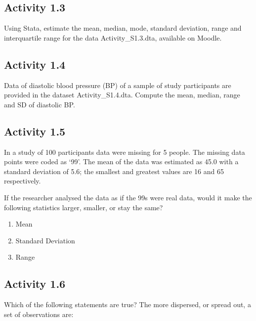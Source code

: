 \documentclass[
]{memoir}
\providecommand{\tightlist}{%
  \setlength{\itemsep}{0pt}\setlength{\parskip}{0pt}}
\begin{document}
\hypertarget{activity-1.3}{%
\subsection*{Activity 1.3}\label{activity-1.3}}

Using Stata, estimate the mean, median, mode, standard deviation, range and interquartile range for the data Activity\_S1.3.dta, available on Moodle.

\hypertarget{activity-1.4}{%
\subsection*{Activity 1.4}\label{activity-1.4}}

Data of diastolic blood pressure (BP) of a sample of study participants are provided in the dataset Activity\_S1.4.dta. Compute the mean, median, range and SD of diastolic BP.

\hypertarget{activity-1.5}{%
\subsection*{Activity 1.5}\label{activity-1.5}}

In a study of 100 participants data were missing for 5 people. The missing data points were coded as `99'. The mean of the data was estimated as 45.0 with a standard deviation of 5.6; the smallest and greatest values are 16 and 65 respectively.

If the researcher analysed the data as if the 99s were real data, would it make the following statistics larger, smaller, or stay the same?

\begin{enumerate}
\def\labelenumi{\alph{enumi})}
\tightlist
\item
  Mean
\item
  Standard Deviation
\item
  Range
\end{enumerate}

\hypertarget{activity-1.6}{%
\subsection*{Activity 1.6}\label{activity-1.6}}

Which of the following statements are true? The more dispersed, or spread out, a set of observations are:
\end{document}
